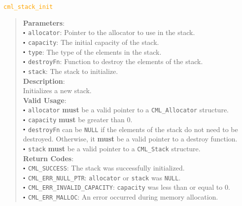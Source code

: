 \documentclass[a4paper,oneside,8pt]{extarticle}
\newcommand{\macro}[1]{
  \noindent\textcolor{orange}{\texttt{#1}}
  \vspace{-0.3em}
}
\renewcommand{\dot}{\raisebox{0.3ex}{\scalebox{0.6}{$\bullet$}}}
\theoremstyle{definition}
\begin{document}
\macro{cml\_stack\_init}
\begin{quote}
  \textbf{Parameters}: \\
  $\dot$ \texttt{allocator}: Pointer to the allocator to use in the stack. \\
  $\dot$ \texttt{capacity}: The initial capacity of the stack. \\
  $\dot$ \texttt{type}: The type of the elements in the stack. \\
  $\dot$ \texttt{destroyFn}: Function to destroy the elements of the stack. \\
  $\dot$ \texttt{stack}: The stack to initialize. \\
  
  \vspace{-0.75em}
  \textbf{Description}: \\
  Initializes a new stack. \\

  \vspace{-0.75em}
  \textbf{Valid Usage}: \\
  $\dot$ \texttt{allocator} \textbf{must} be a valid pointer to a \texttt{CML\_Allocator} structure. \\
  $\dot$ \texttt{capacity} \textbf{must} be greater than 0. \\
  $\dot$ \texttt{destroyFn} can be \texttt{NULL} if the elements of the stack do not need to be destroyed. Otherwise, it \textbf{must} be a valid pointer to a destroy function. \\
  $\dot$ \texttt{stack} \textbf{must} be a valid pointer to a \texttt{CML\_Stack} structure. \\

  \vspace{-0.75em}
  \textbf{Return Codes}: \\
  $\dot$ \texttt{CML\_SUCCESS}: The stack was successfully initialized. \\
  $\dot$ \texttt{CML\_ERR\_NULL\_PTR}: \texttt{allocator} or \texttt{stack} was \texttt{NULL}. \\
  $\dot$ \texttt{CML\_ERR\_INVALID\_CAPACITY}: \texttt{capacity} was less than or equal to 0. \\
  $\dot$ \texttt{CML\_ERR\_MALLOC}: An error occurred during memory allocation. \\
\end{quote}
\end{document}
